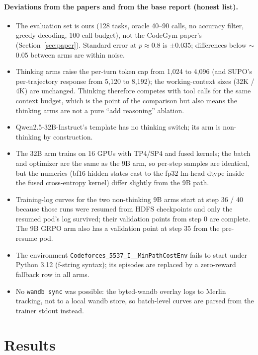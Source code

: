 \documentclass[11pt]{article}
\newcommand{\p}[1]{\texttt{#1}}
\begin{document}
\paragraph{Deviations from the papers and from the base report (honest list).}
\begin{itemize}[nosep]
\item The evaluation set is ours (128 tasks, oracle 40--90 calls, no accuracy filter, greedy decoding, 100-call budget), not the CodeGym paper's (Section~\ref{sec:paper}). Standard error at $p\approx0.8$ is $\pm0.035$; differences below $\sim$0.05 between arms are within noise.
\item Thinking arms raise the per-turn token cap from 1{,}024 to 4{,}096 (and SUPO's per-trajectory response from 5{,}120 to 8{,}192); the working-context sizes (32K / 4K) are unchanged. Thinking therefore competes with tool calls for the same context budget, which is the point of the comparison but also means the thinking arms are not a pure ``add reasoning'' ablation.
\item Qwen2.5-32B-Instruct's template has no thinking switch; its arm is non-thinking by construction.
\item The 32B arm trains on 16 GPUs with TP4/SP4 and fused kernels; the batch and optimizer are the same as the 9B arm, so per-step samples are identical, but the numerics (bf16 hidden states cast to the fp32 lm-head dtype inside the fused cross-entropy kernel) differ slightly from the 9B path.
\item Training-log curves for the two non-thinking 9B arms start at step 36 / 40 because those runs were resumed from HDFS checkpoints and only the resumed pod's log survived; their validation points from step 0 are complete. The 9B GRPO arm also has a validation point at step 35 from the pre-resume pod.
\item The environment \p{Codeforces\_5537\_I\_\_MinPathCostEnv} fails to start under Python 3.12 (f-string syntax); its episodes are replaced by a zero-reward fallback row in all arms.
\item No \p{wandb sync} was possible: the byted-wandb overlay logs to Merlin tracking, not to a local wandb store, so batch-level curves are parsed from the trainer stdout instead.
\end{itemize}

\section{Results}
\end{document}
